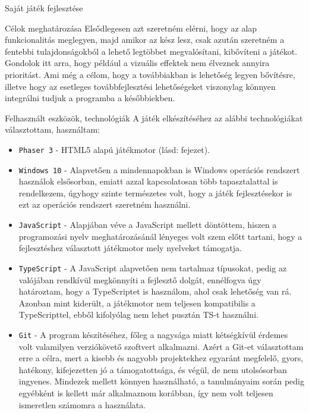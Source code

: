 \begin{MyChapter}{Saját játék fejlesztése}
\begin{MySection}{Célok meghatározása}
		Elsődlegesen azt szeretném elérni, hogy az alap funkcionalitás meglegyen, majd amikor az kész lesz, csak azután szeretném a fentebbi tulajdonságokból a lehető legtöbbet megvalósítani, kibővíteni a játékot. Gondolok itt arra, hogy például a vizuális effektek nem élveznek annyira prioritást. Ami még a célom, hogy a továbbiakban is lehetőség legyen bővítésre, illetve hogy az esetleges továbbfejlesztési lehetőségeket viszonylag könnyen integrálni tudjuk a programba a későbbiekben.
	\end{MySection}
		
	\begin{MySection}{Felhasznált eszközök, technológiák}
		A játék elkészítéséhez az alábbi technológiákat választottam, használtam:
		
		\begin{itemize}
			\item \texttt{Phaser 3} - HTML5 alapú játékmotor (lásd:  fejezet).
			
			\item \texttt{Windows 10} - Alapvetően a mindennapokban is Windows operációs rendszert használok elsősorban, emiatt azzal kapcsolatosan több tapasztalattal is rendelkezem, úgyhogy szinte természetes volt, hogy a játék fejlesztésekor is ezt az operációs rendszert szeretném használni.
			
			\item \texttt{JavaScript} - Alapjában véve a JavaScript mellett döntöttem, hiszen a programozási nyelv meghatározásánál lényeges volt szem előtt tartani, hogy a fejlesztéshez választott játékmotor mely nyelveket támogatja.
			
			\item \texttt{TypeScript} - A JavaScript alapvetően nem tartalmaz típusokat, pedig az valójában rendkívül megkönnyíti a fejlesztő dolgát, ennélfogva úgy határoztam, hogy a TypeScriptet is használom, ahol csak lehetőség van rá. Azonban mint kiderült, a játékmotor nem teljesen kompatibilis a TypeScripttel, ebből kifolyólag nem lehet pusztán TS-t használni.
			
			\item \texttt{Git} - A program készítéséhez, főleg a nagysága miatt kétségkívül érdemes volt valamilyen verziókövető szoftvert alkalmazni. Azért a Git-et választottam erre a célra, mert a kisebb és nagyobb projektekhez egyaránt megfelelő, gyors, hatékony, kifejezetten jó a támogatottsága, és végül, de nem utolsósorban ingyenes. Mindezek mellett könnyen használható, a tanulmányaim során pedig egyébként is kellett már alkalmaznom korábban, így nem volt teljesen ismeretlen számomra a használata.
			

\end{itemize}
\end{MySection}
\end{MyChapter}
